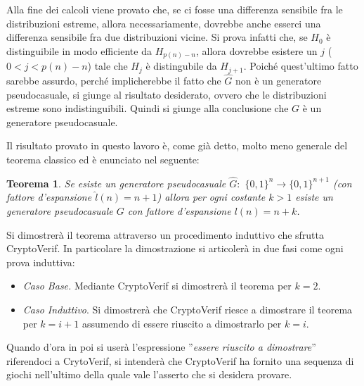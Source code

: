 \documentclass[a4paper,openright,twoside,12pt]{report}
\newtheorem{teorema}{Teorema}[chapter]
\begin{document}
Alla fine dei calcoli viene provato che, se ci fosse una differenza sensibile fra le distribuzioni estreme, allora 
necessariamente, dovrebbe anche esserci una differenza
sensibile fra due distribuzioni vicine. Si prova infatti che, se $H_0$ \`e distinguibile in modo efficiente da $H_{p(n)-n}$, allora
dovrebbe esistere un $j$ ($0<j<p(n)-n$) tale che $H_j$ \`e distingubile da $H_{j+1}$.
Poich\'e quest'ultimo fatto sarebbe assurdo, perch\'e implicherebbe il fatto che $\hat{G}$ non \`e un generatore pseudocasuale, si
giunge al risultato desiderato, ovvero che le distribuzioni estreme sono indistinguibili. Quindi si giunge alla conclusione che $G$ 
\`e un generatore pseudocasuale.


Il risultato provato in questo lavoro \`e, come gi\`a detto, molto meno generale del teorema classico ed \`e enunciato nel seguente:
\begin{teorema}
Se esiste un generatore pseudocasuale $\hat{G}:$ $\{0, 1\}^n \rightarrow \{0, 1\}^{n+1}$ 
(con fattore d'espansione $\hat{l}(n)=n+1$) allora per ogni costante $k > 1$ esiste un generatore 
pseudocasuale $G$ con fattore d'espansione $l(n)=n+k$.
\end{teorema}

Si dimostrer\`a il teorema attraverso un procedimento induttivo che sfrutta CryptoVerif. 
In particolare la dimostrazione si articoler\`a in due fasi come ogni prova induttiva:
\begin{itemize}
 \item \emph{Caso Base.} Mediante CryptoVerif si dimostrer\`a il teorema per $k=2$.
 \item \emph{Caso Induttivo}. Si dimostrer\`a che CryptoVerif riesce a dimostrare il teorema per $k=i+1$ assumendo di essere riuscito a dimostrarlo per $k=i$.
\end{itemize}


Quando d'ora in poi si user\`a l'espressione ''\emph{essere riuscito a dimostrare}'' riferendoci a CrytoVerif, si intender\`a che CryptoVerif ha fornito una sequenza di giochi 
nell'ultimo della quale vale l'asserto che si desidera provare.

\newpage
\end{document}
